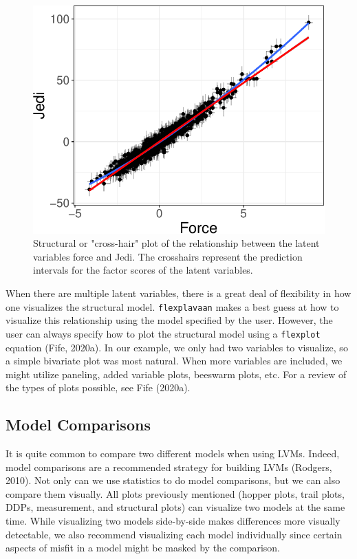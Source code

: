 \documentclass[
  english,
  man]{apa6}
\begin{document}
\begin{figure}

{\centering \includegraphics[width=0.5\linewidth]{flexplavaan_draft_files/figure-latex/beech-1} 

}

\caption{Structural or "cross-hair" plot of the relationship between the latent variables force and Jedi. The crosshairs represent the prediction intervals for the factor scores of the latent variables.}\label{fig:beech}
\end{figure}

When there are multiple latent variables, there is a great deal of flexibility in how one visualizes the structural model. \texttt{flexplavaan} makes a best guess at how to visualize this relationship using the model specified by the user. However, the user can always specify how to plot the structural model using a \texttt{flexplot} equation (Fife, 2020a). In our example, we only had two variables to visualize, so a simple bivariate plot was most natural. When more variables are included, we might utilize paneling, added variable plots, beeswarm plots, etc. For a review of the types of plots possible, see Fife (2020a).

\hypertarget{model-comparisons}{%
\subsection{Model Comparisons}\label{model-comparisons}}

It is quite common to compare two different models when using LVMs. Indeed, model comparisons are a recommended strategy for building LVMs (Rodgers, 2010). Not only can we use statistics to do model comparisons, but we can also compare them visually. All plots previously mentioned (hopper plots, trail plots, DDPs, measurement, and structural plots) can visualize two models at the same time. While visualizing two models side-by-side makes differences more visually detectable, we also recommend visualizing each model individually since certain aspects of misfit in a model might be masked by the comparison.
\end{document}
